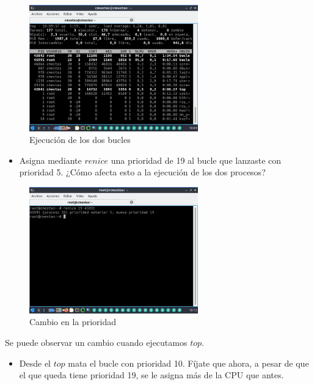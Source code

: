 \documentclass[12pt]{article}
\begin{document}
\clearpage
\newpage

\begin{figure}[h]
    \centering
    \includegraphics[width=0.65\textwidth]{images/screenA22.jpg}
    \caption{Ejecución de los dos bucles}
\end{figure}

\begin{itemize}
    \item Asigna mediante $renice$ una prioridad de 19 al bucle que lanzaste con prioridad 5. ¿Cómo afecta esto a la ejecución de los dos procesos?
\end{itemize}

\begin{figure}[h]
    \centering
    \includegraphics[width=0.65\textwidth]{images/screenA23.jpg}
    \caption{Cambio en la prioridad}
\end{figure}

Se puede observar un cambio cuando ejecutamos $top$.

\clearpage
\newpage

\begin{itemize}
    \item Desde el $top$ mata el bucle con prioridad 10. Fíjate que ahora, a pesar de que el que queda tiene prioridad 19, se le asigna más de la CPU que antes.
\end{itemize}
\end{document}
